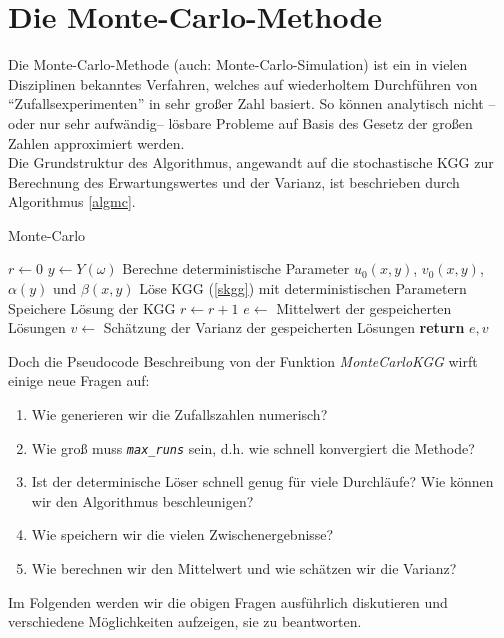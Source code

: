 \section{Die Monte-Carlo-Methode} %
Die Monte-Carlo-Methode (auch: Monte-Carlo-Simulation) ist ein in vielen Disziplinen bekanntes Verfahren, welches auf wiederholtem Durchführen von "`Zufallsexperimenten"' in sehr großer Zahl basiert. So können analytisch nicht --oder nur sehr aufwändig-- lösbare Probleme auf Basis des Gesetz der großen Zahlen approximiert werden.\\
Die Grundstruktur des Algorithmus, angewandt auf die stochastische KGG zur Berechnung des Erwartungswertes und der Varianz, ist beschrieben durch Algorithmus \ref{algmc}.
\begin{algorithm}[ht]
    \caption{Monte-Carlo}
    \label{algmc}
    \begin{algorithmic}[1] %
            \State $r\gets 0$
             
                \State $y \gets Y(\omega)$ 
                \State Berechne deterministische Parameter $u_0(x,y)$, $v_0(x,y)$, $\alpha(y)$ und $\beta(x,y)$
                \State Löse KGG (\ref{skgg}) mit deterministischen Parametern
                \State Speichere Lösung der KGG
                \State $r\gets r+1$
            \EndWhile
            \State $e\gets$ Mittelwert der gespeicherten Lösungen
            \State $v\gets$ Schätzung der Varianz der gespeicherten Lösungen
            \State \textbf{return} $e, v$
        \EndFunction
    \end{algorithmic}
\end{algorithm}
Doch die Pseudocode Beschreibung von der Funktion \emph{MonteCarloKGG} wirft einige neue Fragen auf:
\begin{enumerate}
\item Wie generieren wir die Zufallszahlen numerisch? \label{mcgeneraterandom}
\item Wie groß muss \emph{\texttt{max\_runs}} sein, d.h. wie schnell konvergiert die Methode?
\item Ist der determinische Löser schnell genug für viele Durchläufe? Wie können wir den Algorithmus beschleunigen?\label{mcalgspeed}
\item Wie speichern wir die vielen Zwischenergebnisse? \label{mcsaveresults}
\item Wie berechnen wir den Mittelwert und wie schätzen wir die Varianz? \label{mcestimations}
\end{enumerate}
Im Folgenden werden wir die obigen Fragen ausführlich diskutieren und verschiedene Möglichkeiten aufzeigen, sie zu beantworten.
